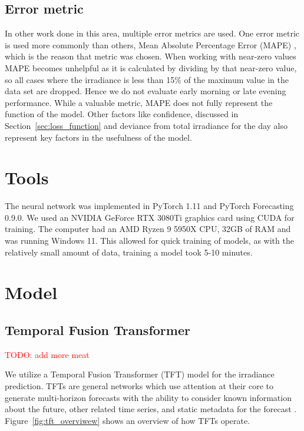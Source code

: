 \subsection{Error metric}
In other work done in this area, multiple error metrics are used. One error metric is used more commonly than others, Mean Absolute Percentage Error (MAPE) \cite{lin_temporal_2020, lee_forecasting_2018, jaidee_very_2019, su_machine_2019}, which is the reason that metric was chosen.
When working with near-zero values MAPE becomes unhelpful as it is calculated by dividing by that near-zero value, so all cases where the irradiance is less than 15\% of the maximum value in the data set are dropped. Hence we do not evaluate early morning or late evening performance.
While a valuable metric, MAPE does not  fully represent the function of the model. Other factors like confidence, discussed in Section~\ref{sec:loss_function} and deviance from total irradiance for the day also represent key factors in the usefulness of the model.




\section{Tools}
The neural network was implemented in PyTorch 1.11 and PyTorch Forecasting 0.9.0. We used an NVIDIA GeForce RTX 3080Ti graphics card using CUDA for training. The computer had an AMD Ryzen 9 5950X CPU, 32GB of RAM and was running Windows 11.
This allowed for quick training of models, as with the relatively small amount of data, training a model took 5-10 minutes.


\section{Model}
    \subsection{Temporal Fusion Transformer}
    \textcolor{red}{TODO: add more meat}
    
    \noindent We utilize a Temporal Fusion Transformer (TFT) model for the irradiance prediction.
    TFTs are  general networks which use attention at their core to generate multi-horizon forecasts with the ability to consider
    known information about the future, other related time series, and static metadata for the forecast \cite{lim_temporal_2020}. Figure~\ref{fig:tft_overviwew} shows an overview of how TFTs operate.
    
